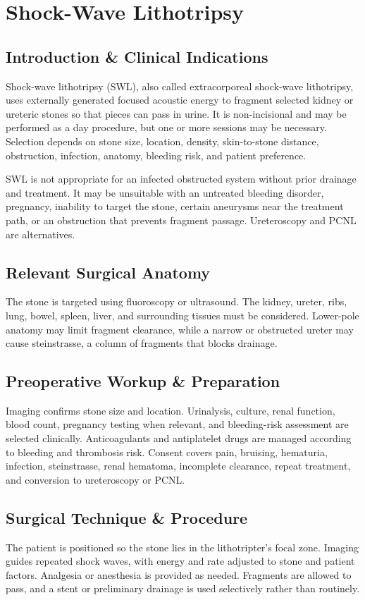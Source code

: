 \chapter{Shock-Wave Lithotripsy}

\section*{Introduction \& Clinical Indications}
Shock-wave lithotripsy (SWL), also called extracorporeal shock-wave lithotripsy, uses externally generated focused acoustic energy to fragment selected kidney or ureteric stones so that pieces can pass in urine. It is non-incisional and may be performed as a day procedure, but one or more sessions may be necessary. Selection depends on stone size, location, density, skin-to-stone distance, obstruction, infection, anatomy, bleeding risk, and patient preference.

SWL is not appropriate for an infected obstructed system without prior drainage and treatment. It may be unsuitable with an untreated bleeding disorder, pregnancy, inability to target the stone, certain aneurysms near the treatment path, or an obstruction that prevents fragment passage. Ureteroscopy and PCNL are alternatives.

\section*{Relevant Surgical Anatomy}
The stone is targeted using fluoroscopy or ultrasound. The kidney, ureter, ribs, lung, bowel, spleen, liver, and surrounding tissues must be considered. Lower-pole anatomy may limit fragment clearance, while a narrow or obstructed ureter may cause steinstrasse, a column of fragments that blocks drainage.

\section*{Preoperative Workup \& Preparation}
Imaging confirms stone size and location. Urinalysis, culture, renal function, blood count, pregnancy testing when relevant, and bleeding-risk assessment are selected clinically. Anticoagulants and antiplatelet drugs are managed according to bleeding and thrombosis risk. Consent covers pain, bruising, hematuria, infection, steinstrasse, renal hematoma, incomplete clearance, repeat treatment, and conversion to ureteroscopy or PCNL.

\section*{Surgical Technique \& Procedure}
The patient is positioned so the stone lies in the lithotripter's focal zone. Imaging guides repeated shock waves, with energy and rate adjusted to stone and patient factors. Analgesia or anesthesia is provided as needed. Fragments are allowed to pass, and a stent or preliminary drainage is used selectively rather than routinely.

